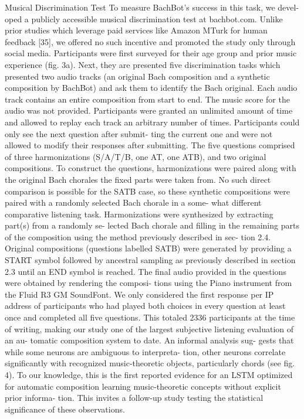 Musical Discrimination Test
To measure BachBot’s success in this task, we devel- oped a publicly accessible musical discrimination test at bachbot.com. Unlike prior studies which leverage paid services like Amazon MTurk for human feedback [35], we offered no such incentive and promoted the study only through social media. Participants were first surveyed for their age group and prior music experience (fig. 3a). Next, they are presented five discrimination tasks which presented two audio tracks (an original Bach composition and a synthetic composition by BachBot) and ask them to identify the Bach original. Each audio track contains an entire composition from start to end. The music score for the audio was not provided. Participants were granted an unlimited amount of time and allowed to replay each track an arbitrary number of times. Participants could only see the next question after submit- ting the current one and were not allowed to modify their responses after submitting. The five questions comprised of three harmonizations (S/A/T/B, one AT, one ATB), and two original compositions. To construct the questions, harmonizations were paired along with the original Bach chorales the fixed parts were taken from. No such direct comparison is possible for the SATB case, so these synthetic compositions were paired with a randomly selected Bach chorale in a some- what different comparative listening task. Harmonizations were synthesized by extracting part(s) from a randomly se- lected Bach chorale and filling in the remaining parts of the composition using the method previously described in sec- tion 2.4. Original compositions (questions labelled SATB) were generated by providing a START symbol followed by ancestral sampling as previously described in section 2.3 until an END symbol is reached. The final audio provided in the questions were obtained by rendering the composi- tions using the Piano instrument from the Fluid R3 GM SoundFont.
We only considered the first response per IP address of participants who had played both choices in every question at least once and completed all five questions. This totaled 2336 participants at the time of writing, making our study one of the largest subjective listening evaluation of an au- tomatic composition system to date.
An informal analysis sug- gests that while some neurons are ambiguous to interpreta- tion, other neurons correlate significantly with recognized music-theoretic objects, particularly chords (see fig. 4). To our knowledge, this is the first reported evidence for an LSTM optimized for automatic composition learning music-theoretic concepts without explicit prior informa- tion. This invites a follow-up study testing the statistical significance of these observations.


